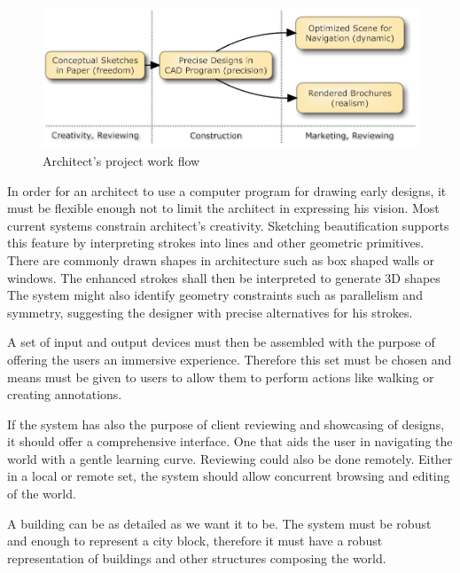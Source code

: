 \begin{figure}[!ht]
	\centering
	\includegraphics[width=12cm]{gfx/workflow1.png}
	\caption{Architect's project work flow}
	\label{FIG-WORKFLOW1}
\end{figure}

In order for an architect to use a computer program for drawing early designs,
it must be flexible enough not to limit the architect in expressing his vision.
Most current systems constrain architect's creativity\cite{TOW3D}.
Sketching beautification supports this feature by interpreting strokes
into lines and other geometric primitives.
There are commonly drawn shapes in architecture such as box shaped walls or windows.
The enhanced strokes shall then be interpreted to generate 3D shapes
The system might also identify geometry constraints such as parallelism and symmetry,
suggesting the designer with precise alternatives for his strokes.

A set of input and output devices must then be assembled with the purpose of offering
the users an immersive experience. Therefore this set must be chosen and
means must be given to users to allow them to perform actions like walking or creating
annotations.

If the system has also the purpose of client reviewing and showcasing of designs,
it should offer a comprehensive interface.
One that aids the user in navigating the world with a gentle learning curve.
Reviewing could also be done remotely.
Either in a local or remote set, the system should allow
concurrent browsing and editing of the world.

A building can be as detailed as we want it to be.
The system must be robust and enough to represent a city block, therefore it must have a
robust representation of buildings and other structures composing the world.

